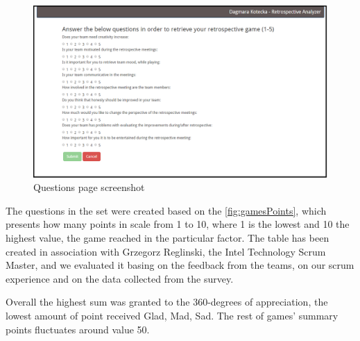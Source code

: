 \begin{figure}[h]
\caption{Questions page screenshot}
\label{fig:questionsPage}
\centering
\includegraphics[width=1\textwidth]{screenshots/questions.png}
\end{figure}

The questions in the set were created based on the \autoref{fig:gamesPoints}, which presents how many points in scale from 1 to 10, where 1 is the lowest and 10 the highest value, the game reached in the particular factor. The table has been created in association with Grzegorz Reglinski, the Intel Technology Scrum Master, and we evaluated it basing on the feedback from the teams, on our scrum experience and on the data collected from the survey.

Overall the highest sum was granted to the 360-degrees of appreciation, the lowest amount of point received Glad, Mad, Sad. The rest of games' summary points fluctuates around value 50.


